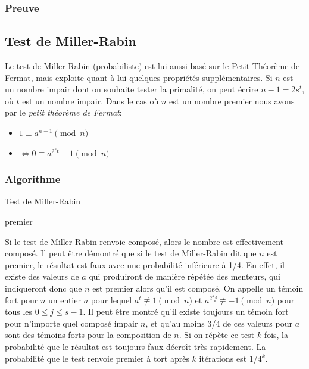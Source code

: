 			\subsubsection{Preuve}
		
		\subsection{Test de Miller-Rabin}
			Le test de Miller-Rabin (probabiliste) est lui aussi basé sur le Petit Théorème de Fermat, mais exploite quant à lui quelques propriétés supplémentaires.
			Si $n$ est un nombre impair dont on souhaite tester la primalité, on peut écrire $n − 1 = 2s^{t}$, où $t$ est un nombre impair. 
			Dans le cas où $n$ est un nombre premier nous avons par le \textit{petit théorème de Fermat}:
				\begin{itemize}
				\item $1 \equiv a^{n-1} \pmod n$
				\item $\Leftrightarrow 0 \equiv a^{2^{s}t}-1 \pmod n$
				\end{itemize}
		
		\subsubsection{Algorithme}
			\begin{algorithm}
					\caption{Test de Miller-Rabin\label{TF}}
					{\Retour premier\;}	
			\end{algorithm}
			
			Si le test de Miller-Rabin renvoie composé, alors le nombre est effectivement composé. 
			Il peut être démontré que si le test de Miller-Rabin dit que $n$ est premier, le résultat est faux avec une probabilité inférieure à 1/4. 
			En effet, il existe des valeurs de $a$ qui produiront de manière répétée des menteurs, qui indiqueront donc que $n$ est premier alors qu’il est composé. On appelle un témoin fort pour $n$ un entier $a$ pour lequel
				$a^{t}\not\equiv 1 \pmod n$ et $a^{2^{s}j}\not\equiv -1 \pmod n$ pour tous les $0\le j\le s-1$.
			Il peut être montré qu’il existe toujours un témoin fort pour n’importe quel composé impair $n$, et qu’au moins 3/4 de ces valeurs pour $a$ sont des témoins forts pour la composition de $n$. 
			Si on répète ce test $k$ fois, la probabilité que le résultat est toujours faux décroît très rapidement. La probabilité que le test renvoie premier à tort après $k$ itérations est $1$/${4^{k}}$.
			
